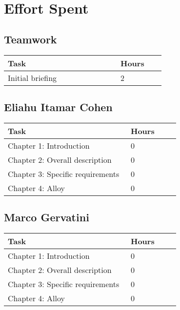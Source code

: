 \chapter{Effort Spent}

\section{Teamwork}
\begin{center}
    \begin{tabular}{@{}p{0.5\linewidth} p{0.2\linewidth}@{}}
        \hline
        \textbf{Task} & \textbf{Hours} \\ \hline
        Initial briefing & 2 \\ \hline
    \end{tabular}
\end{center}

\section{Eliahu Itamar Cohen}
\begin{center}
    \begin{tabular}{@{}p{0.5\linewidth} p{0.2\linewidth}@{}}
        \hline
        \textbf{Task} & \textbf{Hours} \\ \hline
        Chapter 1: Introduction & 0 \\ \hline
        Chapter 2: Overall description & 0 \\ \hline
        Chapter 3: Specific requirements & 0 \\ \hline
        Chapter 4: Alloy & 0 \\ \hline
    \end{tabular}
\end{center}

\section{Marco Gervatini}
\begin{center}
	\begin{tabular}{@{}p{0.5\linewidth} p{0.2\linewidth}@{}}
		\hline
		\textbf{Task} & \textbf{Hours} \\ \hline
            Chapter 1: Introduction & 0 \\ \hline
            Chapter 2: Overall description & 0 \\ \hline
            Chapter 3: Specific requirements & 0 \\ \hline
            Chapter 4: Alloy & 0 \\ \hline
	\end{tabular}
\end{center}

